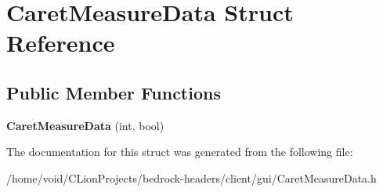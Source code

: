 \hypertarget{struct_caret_measure_data}{}\section{Caret\+Measure\+Data Struct Reference}
\label{struct_caret_measure_data}
\subsection*{Public Member Functions}
\begin{DoxyCompactItemize}
\item 
\mbox{\label{struct_caret_measure_data_acd6152ab7cb23fab30785f6505f9e22f}} 
{\bfseries Caret\+Measure\+Data} (int, bool)
\end{DoxyCompactItemize}


The documentation for this struct was generated from the following file\+:\begin{DoxyCompactItemize}
\item 
/home/void/\+C\+Lion\+Projects/bedrock-\/headers/client/gui/Caret\+Measure\+Data.\+h\end{DoxyCompactItemize}
